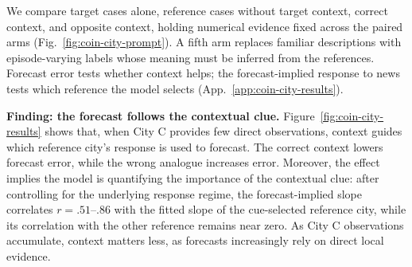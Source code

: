 \documentclass{article}
\begin{document}
We compare target cases alone, reference cases without target context, correct
context, and opposite context, holding numerical evidence fixed across the paired
arms (Fig.~\ref{fig:coin-city-prompt}). A fifth arm replaces familiar descriptions
with episode-varying labels whose meaning must be inferred from the references.
Forecast error tests whether context helps; the forecast-implied response to news
tests which reference the model selects (App.~\ref{app:coin-city-results}).

\noindent\textbf{Finding: the forecast follows the contextual clue.}
Figure~\ref{fig:coin-city-results} shows that, when City C provides few direct
observations, context guides which reference city's response is used to forecast.
The correct context lowers forecast error, while the wrong analogue increases
error. Moreover, the effect implies the model is quantifying the importance of
the contextual clue: after controlling for the underlying response regime, the
forecast-implied slope correlates $r=.51$--$.86$ with the fitted slope of the
cue-selected reference city, while its correlation with the other reference
remains near zero. As City C observations accumulate, context matters less, as
forecasts increasingly rely on direct local evidence.
\end{document}
